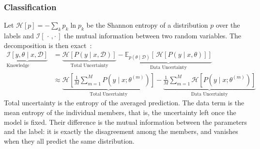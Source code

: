     \subsubsection{Classification}  
        Let $\mathcal{H}[p] = -\sum_k p_k \ln p_k$ be the Shannon entropy of a
        distribution $p$ over the labels and $\mathcal{I}[\,\cdot\,,\cdot\,]$
        the mutual information between two random variables. The decomposition is
        then exact~\cite{malinin2021,depeweg2017decomposition,depeweg2018}:
        \begin{align}
            \underbrace{\mathcal{I}\!\left[ y, \theta \mid x, \mathcal{D} \right]}_{\text{Knowledge Uncertainty}} 
            &= \underbrace{\mathcal{H}\!\left[ P(y \mid x, \mathcal{D}) \right]}_{\text{Total Uncertainty}} - \underbrace{\mathbb{E}_{p(\theta \mid \mathcal{D})}\!\left[\, \mathcal{H}\!\left[ P(y \mid x,\theta) \right]\right]}_{\text{Data Uncertainty}} \\[1.2ex]
            &\approx 
            \underbrace{\mathcal{H}\!\left[ \frac{1}{M} \sum_{m=1}^{M} P(y \mid x; \theta^{(m)}) \right]}_{\text{Total Uncertainty}} - \underbrace{\frac{1}{M} \sum_{m=1}^{M} \mathcal{H}\!\left[ P(y \mid x; \theta^{(m)}) \right]}_{\text{Data Uncertainty}}
        \end{align}
        Total uncertainty is the entropy of the averaged prediction. The data term is
        the mean entropy of the individual members, that is, the uncertainty left once
        the model is fixed. Their difference is the mutual information between the
        parameters and the label: it is exactly the disagreement among the members,
        and vanishes when they all predict the same distribution.

